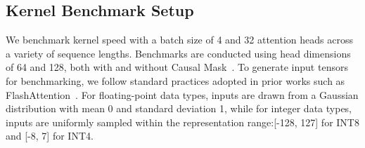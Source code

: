 \subsection{Kernel Benchmark Setup}  \label{sec:kernel_benchmark_setting}
We benchmark kernel speed with a batch size of 4 and 32 attention heads across a variety of sequence lengths. Benchmarks are conducted using head dimensions of 64 and 128, both with and without Causal Mask~\cite{vaswani2017attention}. To generate input tensors for benchmarking, we follow standard practices adopted in prior works such as FlashAttention~\cite{dao2022flashattention}. For floating-point data types, inputs are drawn from a Gaussian distribution with mean 0 and standard deviation 1, while for integer data types, inputs are uniformly sampled within the representation range:[-128, 127] for INT8 and [-8, 7] for INT4.

\begin{table}[h!]
    \caption{End-to-end metrics on \llama (7B).}
    \label{exp:metrics_loss_t2t-appendix}
    \setlength\tabcolsep{5.5pt}
    \begin{center}
    \end{center}
    \vspace{-1em}
\end{table}


